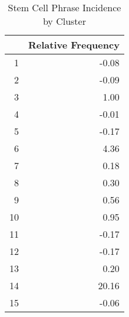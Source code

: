 \begin{table}[ht]
\centering
\begin{tabular}{rr}
  \hline
 & Relative Frequency \\ 
  \hline
1 & -0.08 \\ 
  2 & -0.09 \\ 
  3 & 1.00 \\ 
  4 & -0.01 \\ 
  5 & -0.17 \\ 
  6 & 4.36 \\ 
  7 & 0.18 \\ 
  8 & 0.30 \\ 
  9 & 0.56 \\ 
  10 & 0.95 \\ 
  11 & -0.17 \\ 
  12 & -0.17 \\ 
  13 & 0.20 \\ 
  14 & 20.16 \\ 
  15 & -0.06 \\ 
   \hline
\end{tabular}
\caption{Stem Cell Phrase Incidence by Cluster} 
\label{tab:stemcell}
\end{table}
